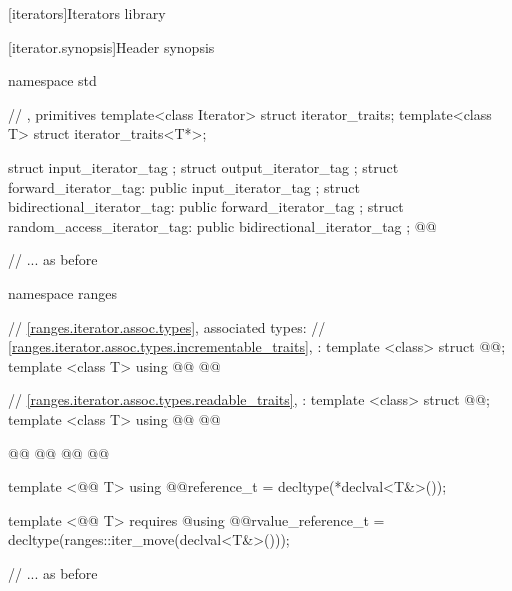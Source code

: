 \setcounter{chapter}{26}
[iterators]{Iterators library}

\setcounter{section}{2}
[iterator.synopsis]{Header  synopsis}

%
\begin{codeblock}
namespace std {
  // , primitives
  template<class Iterator> struct iterator_traits;
  template<class T> struct iterator_traits<T*>;

  struct input_iterator_tag { };
  struct output_iterator_tag { };
  struct forward_iterator_tag: public input_iterator_tag { };
  struct bidirectional_iterator_tag: public forward_iterator_tag { };
  struct random_access_iterator_tag: public bidirectional_iterator_tag { };
  @@

  // ... as before

  namespace ranges {
    // \ref{ranges.iterator.assoc.types}, associated types:
    // \ref{ranges.iterator.assoc.types.incrementable_traits}, :
    template <class> struct @@;
    template <class T> using @@
      @@

    // \ref{ranges.iterator.assoc.types.readable_traits}, :
    template <class> struct @@;
    template <class T> using @@
      @@

    @@
    @@
    @@
      @@

    template <@@ T> using @@reference_t
      = decltype(*declval<T&>());

    template <@@ T>
        requires @\seebelow@ using @@rvalue_reference_t
      = decltype(ranges::iter_move(declval<T&>()));

    // ... as before

}}
\end{codeblock}

